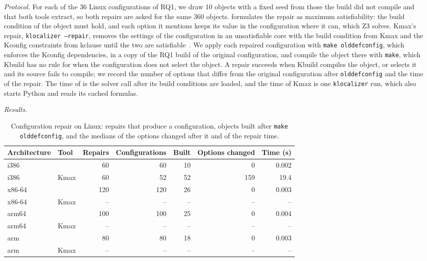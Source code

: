 \documentclass[acmsmall,screen,review,anonymous,nonacm]{acmart}
\begin{document}
\emph{Protocol.}
For each of the 36 Linux configurations of RQ1, we draw 10 objects with a fixed seed from those the build did not compile and that both tools extract, so both repairs are asked for the same 360 objects.
\tool{} formulates the repair as maximum satisfiability: the build condition of the object must hold, and each option it mentions keeps its value in the configuration where it can, which Z3 solves.
Kmax's repair, \texttt{klocalizer --repair}, removes the settings of the configuration in an unsatisfiable core with the build condition from Kmax and the Kconfig constraints from kclause until the two are satisfiable~\cite{yildiran2024krepair}.
We apply each repaired configuration with \texttt{make olddefconfig}, which enforces the Kconfig dependencies, in a copy of the RQ1 build of the original configuration, and compile the object there with \texttt{make}, which Kbuild has no rule for when the configuration does not select the object.
A repair succeeds when Kbuild compiles the object, or selects it and its source fails to compile; we record the number of options that differ from the original configuration after \texttt{olddefconfig} and the time of the repair.
The time of \tool{} is the solver call after its build conditions are loaded, and the time of Kmax is one \texttt{klocalizer} run, which also starts Python and reads its cached formulas.

\emph{Results.}

\begin{table}[t]
\centering\footnotesize
\caption{Configuration repair on Linux: repairs that produce a configuration, objects built after \texttt{make olddefconfig}, and the medians of the options changed after it and of the repair time.}
\label{tab:rq3}
\begin{tabular}{llrrrrr}
\toprule
Architecture & Tool & Repairs & Configurations & Built & Options changed & Time (s) \\
\midrule
i386 & \tool{} & 60 & 60 & 10 & 0 & 0.002 \\
i386 & Kmax & 60 & 52 & 52 & 159 & 19.4 \\
x86-64 & \tool{} & 120 & 120 & 26 & 0 & 0.003 \\
x86-64 & Kmax & -- & -- & -- & -- & -- \\
arm64 & \tool{} & 100 & 100 & 25 & 0 & 0.004 \\
arm64 & Kmax & -- & -- & -- & -- & -- \\
arm & \tool{} & 80 & 80 & 18 & 0 & 0.003 \\
arm & Kmax & -- & -- & -- & -- & -- \\
\bottomrule
\end{tabular}
\end{table}
\end{document}
